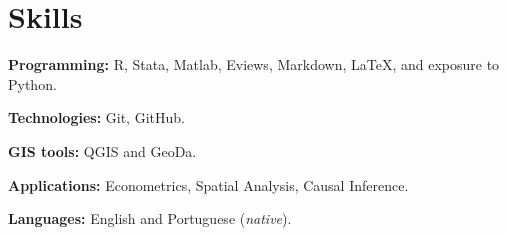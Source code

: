 \documentclass[letterpaper,11pt]{article}
\newcommand{\resumeSubHeadingListStart}{\begin{itemize}[leftmargin=0.15in, label={}]}
\newcommand{\resumeSubHeadingListEnd}{\end{itemize}}
\begin{document}
\section{Skills}
  \vspace{2pt}
  \resumeSubHeadingListStart
    \small{\item{
        \textbf{Programming:}{ R, Stata, Matlab, Eviews, Markdown, LaTeX, and exposure to Python.} \\ \vspace{3pt}
             
        \textbf{Technologies:}{ Git, GitHub.} \\ \vspace{3pt}

        \textbf{GIS tools:}{ QGIS and GeoDa.} \\ \vspace{3pt}

        \textbf{Applications:}{ Econometrics, Spatial Analysis, Causal Inference.} \\ \vspace{3pt}
        
        \textbf{Languages:}{ English and Portuguese (\textit{native}).}
        
    }}
  \resumeSubHeadingListEnd




        
\end{document}
